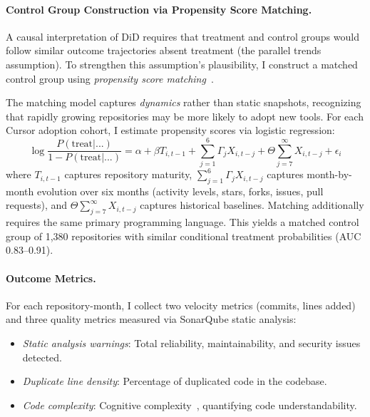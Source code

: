 \paragraph{Control Group Construction via Propensity Score Matching.}
A causal interpretation of DiD requires that treatment and control groups would follow similar outcome trajectories absent treatment (the parallel trends assumption).
To strengthen this assumption's plausibility, I construct a matched control group using \emph{propensity score matching}~\cite{austin2011introduction}.

The matching model captures \emph{dynamics} rather than static snapshots, recognizing that rapidly growing repositories may be more likely to adopt new tools.
For each Cursor adoption cohort, I estimate propensity scores via logistic regression:
\begin{equation}
\log\frac{P(\text{treat}|...)}{1-P(\text{treat}|...)} = \alpha + \beta T_{i, t-1} + \sum_{j=1}^{6}\Gamma_j X_{i,t-j} + \Theta\sum_{j=7}^{\infty}X_{i,t-j} + \epsilon_{i}
\end{equation}
where $T_{i,t-1}$ captures repository maturity, $\sum_{j=1}^{6}\Gamma_j X_{i,t-j}$ captures month-by-month evolution over six months (activity levels, stars, forks, issues, pull requests), and $\Theta\sum_{j=7}^{\infty}X_{i,t-j}$ captures historical baselines.
Matching additionally requires the same primary programming language.
This yields a matched control group of 1,380 repositories with similar conditional treatment probabilities (AUC 0.83--0.91).

\paragraph{Outcome Metrics.}
For each repository-month, I collect two velocity metrics (commits, lines added) and three quality metrics measured via SonarQube static analysis:
\begin{itemize}[leftmargin=15pt]
    \item \emph{Static analysis warnings}: Total reliability, maintainability, and security issues detected.
    \item \emph{Duplicate line density}: Percentage of duplicated code in the codebase.
    \item \emph{Code complexity}: Cognitive complexity~\cite{DBLP:conf/icse/Campbell18}, quantifying code understandability.
\end{itemize}

